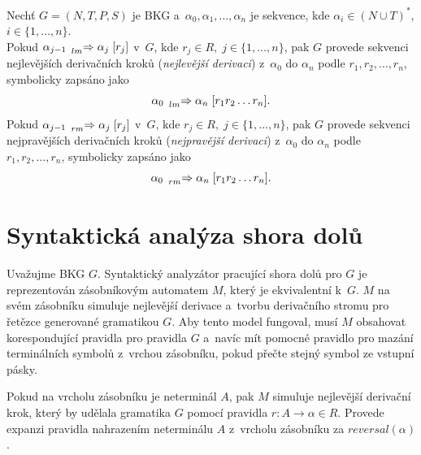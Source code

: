 \begin{definition}\label{def_sekvence_nejl_nejpr_der}
    Nechť $G = (N, T, P, S)$ je BKG a~$\alpha_0, \alpha_1, \ldots, \alpha_n$ je sekvence, kde $\alpha_i \in (N \cup T)^*,$ $i \in \{1, \ldots, n\}$.\\
    Pokud $\alpha_{j-1}\; \prescript{}{\scriptstyle lm}{\Rightarrow}\; \alpha_j\; [r_j]$ v~$G$, kde $r_j \in R,\; j \in \{1, \ldots, n\}$, pak $G$ provede sekvenci nejlevějších derivačních kroků (\emph{nejlevější derivaci}) z~$\alpha_0$ do $\alpha_n$ podle $r_1, r_2, \ldots, r_n$, symbolicky zapsáno jako
    \begin{equation*}
        \alpha_0\; \prescript{}{\scriptstyle lm}{\Rightarrow}\; \alpha_n\; [r_1r_2\ldots r_n].
    \end{equation*} 
    Pokud $\alpha_{j-1}\; \prescript{}{\scriptstyle rm}{\Rightarrow}\; \alpha_j\; [r_j]$ v~$G$, kde $r_j \in R,\; j \in \{1, \ldots, n\}$, pak $G$ provede sekvenci nejpravějších derivačních kroků (\emph{nejpravější derivaci}) z~$\alpha_0$ do $\alpha_n$ podle $r_1, r_2, \ldots, r_n$, symbolicky zapsáno jako
    \begin{equation*}
        \alpha_0\; \prescript{}{\scriptstyle rm}{\Rightarrow}\; \alpha_n\; [r_1r_2\ldots r_n].
    \end{equation*}
\end{definition}


\section{Syntaktická analýza shora dolů}\label{kap_sa_shora_dolu}
Uvažujme BKG $G$.
Syntaktický analyzátor pracující shora dolů pro $G$ je reprezentován zásobníkovým automatem $M$, který je ekvivalentní k~$G$.
$M$ na svém zásobníku simuluje nejlevější derivace a~tvorbu derivačního stromu pro řetězce generované gramatikou $G$.
Aby tento model fungoval, musí $M$ obsahovat korespondující pravidla pro pravidla $G$ a~navíc mít pomocné pravidlo pro mazání terminálních symbolů z~vrchou zásobníku, pokud přečte stejný symbol ze vstupní pásky.

Pokud na vrcholu zásobníku je neterminál $A$, pak $M$ simuluje nejlevější derivační krok, který by udělala gramatika $G$ pomocí pravidla $r: A \rightarrow \alpha \in R$.
Provede expanzi pravidla nahrazením neterminálu $A$ z~vrcholu zásobníku za $reversal(\alpha)$. 

